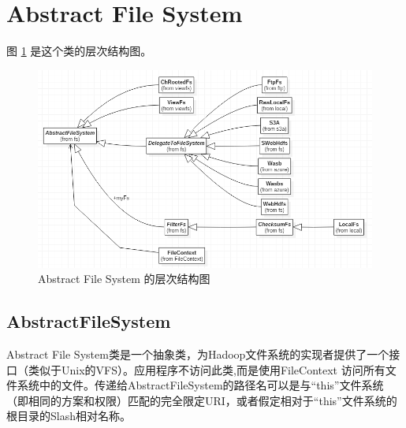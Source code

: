 \section{Abstract File System}

图 \ref{fig:architecture} 是这个类的层次结构图。
\begin{figure}
\centering
\includegraphics[width=1\linewidth]{UML/abstractfilesystem/architecture.PNG}
\caption{Abstract File System 的层次结构图}
\label{fig:architecture}
\end{figure}

\subsection{AbstractFileSystem}
Abstract File System类是一个抽象类，为Hadoop文件系统的实现者提供了一个接口（类似于Unix的VFS）。应用程序不访问此类,而是使用FileContext 访问所有文件系统中的文件。传递给AbstractFileSystem的路径名可以是与“this”文件系统（即相同的方案和权限）匹配的完全限定URI，或者假定相对于“this”文件系统的根目录的Slash相对名称。

